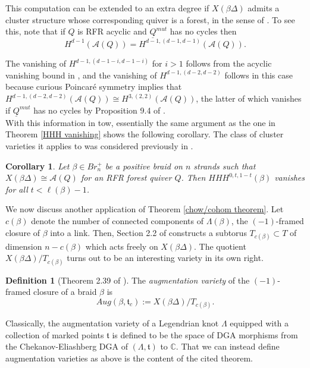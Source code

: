 \documentclass[11pt]{amsart}
\newtheorem{cor}[thm]{Corollary}
\theoremstyle{definition}
\newtheorem{defn}[thm]{Definition}
\theoremstyle{remark}
\numberwithin{equation}{section}
\begin{document}
This computation can be extended to an extra degree if $X(\beta \Delta)$ admits a cluster structure whose corresponding quiver is a forest, in the sense of \cite{schwartz2026homfly}. To see this, note that if $Q$ is RFR acyclic and $\underline{Q}^{mut}$ has no cycles then \begin{equation}
    H^{d-1}(\mathcal{A}(Q)) = H^{d-1, (d-1, d-1)}(\mathcal{A}(Q)).
\end{equation}

The vanishing of $H^{d-1, (d - 1 - i, d - 1 - i)}$ for $i > 1$ follows from the acyclic vanishing bound in \cite{LSII}, and the vanishing of $H^{d-1, (d-2, d-2)}$ follows in this case  because curious Poincar\'e symmetry implies that $H^{d - 1, (d - 2, d - 2)}(\mathcal{A}(Q)) \cong H^{3, (2, 2)}(\mathcal{A}(Q))$, the latter of which vanishes if $\underline{Q}^{mut}$ has no cycles by Proposition 9.4 of \cite{LSII}.\\

With this information in tow, essentially the same argument as the one in Theorem \ref{HHH vanishing} shows the following corollary. The class of cluster varieties it applies to was considered previously in \cite{schwartz2026homfly}.

\begin{cor}\label{forest vanishing}
    Let $\beta \in Br_n^+$ be a positive braid on $n$ strands such that $X(\beta \Delta) \cong \mathcal{A}(Q)$ for an RFR forest quiver $Q$. Then $HHH^{0, t, 1 - t}(\beta)$ vanishes for all $t < \ell(\beta) - 1$.
\end{cor}

We now discuss another application of Theorem \ref{chow/cohom theorem}. Let $c(\beta)$ denote the number of connected components of $\Lambda(\beta)$, the $(-1)$-framed closure of $\beta$ into a link. Then, Section 2.2 of \cite{MR5110495} constructs a subtorus $T_{c(\beta)} \subset T$ of dimension $n - c(\beta)$ which acts freely on $X(\beta \Delta)$. The quotient $X(\beta \Delta)/T_{c(\beta)}$ turns out to be an interesting variety in its own right.
\begin{defn}[Theorem 2.39 of \cite{MR4855860}]
    The \textit{augmentation variety} of the $(-1)$-framed closure of a braid $\beta$ is \begin{equation}
        Aug(\beta, \mathfrak{t}_c) := X(\beta \Delta)/T_{c(\beta)}.
    \end{equation}
\end{defn}

Classically, the augmentation variety of a Legendrian knot $\Lambda$ equipped with a collection of marked points $\mathfrak{t}$ is defined to be the space of DGA morphisms from the Chekanov-Eliashberg DGA of $(\Lambda, \mathfrak{t})$ to $\mathbb{C}$. That we can instead define augmentation varieties as above is the content of the cited theorem.\\
\end{document}
